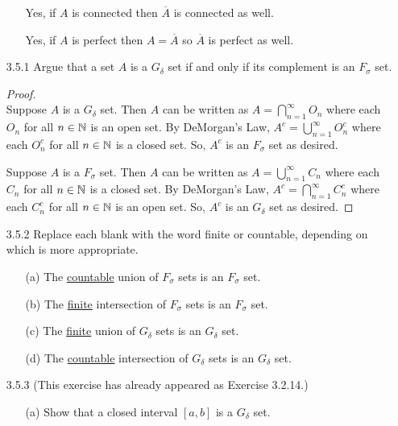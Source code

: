 \documentclass[12pt,letterpaper]{article}
\begin{document}
\begin{itemize}[leftmargin=!,labelindent=5pt]
\begin{itemize}
                    Yes, if $A$ is connected then $\overline{A}$ is connected as well.

                    Yes, if $A$ is perfect then $A = \overline{A}$ so $\overline{A}$ is perfect as well.
            \end{itemize}
        \item [3.5.1] Argue that a set $A$ is a $G_\delta$ set if and only if its complement is an $F_\sigma$ set.
            \begin{proof}
                \ \\
                Suppose $A$ is a $G_\delta$ set.
                Then $A$ can be written as $A = \bigcap_{n=1}^{\infty} O_n$ where each $O_n$ for all $n \in \mathbb{N}$ is an open set.
                By DeMorgan's Law, $A^c = \bigcup_{n=1}^{\infty} O_n^c$ where each $O_n^c$ for all $n \in \mathbb{N}$ is a closed set.
                So, $A^c$ is an $F_\sigma$ set as desired.

                Suppose $A$ is a $F_\sigma$ set.
                Then $A$ can be written as $A = \bigcup_{n=1}^{\infty} C_n$ where each $C_n$ for all $n \in \mathbb{N}$ is a closed set.
                By DeMorgan's Law, $A^c = \bigcap_{n=1}^{\infty} C_n^c$ where each $C_n^c$ for all $n \in \mathbb{N}$ is an open set.
                So, $A^c$ is an $G_\delta$ set as desired.
            \end{proof}
        \item [3.5.2] Replace each blank with the word finite or countable, depending on which is more appropriate.
            \begin{itemize}
                \item [(a)] The \underline{countable} union of $F_\sigma$ sets is an $F_\sigma$ set.
                \item [(b)] The \underline{finite} intersection of $F_\sigma$ sets is an $F_\sigma$ set.
                \item [(c)] The \underline{finite} union of $G_\delta$ sets is an $G_\delta$ set.
                \item [(d)] The \underline{countable} intersection of $G_\delta$ sets is an $G_\delta$ set.
            \end{itemize}
        \item [3.5.3] (This exercise has already appeared as Exercise 3.2.14.)
            \begin{itemize}
                \item [(a)] Show that a closed interval $[a, b]$ is a $G_\delta$ set.
                

\end{itemize}
\end{itemize}
\end{document}
